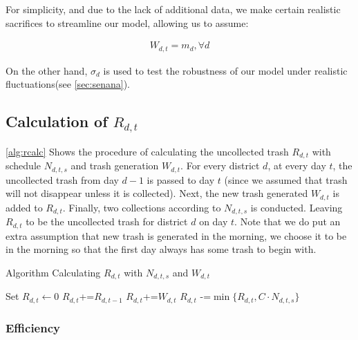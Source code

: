 \documentclass{article}
\begin{document}
For simplicity, and due to the lack of additional data, we make certain realistic sacrifices to streamline our model, allowing us to assume:

\begin{align}
    W_{d,t} = m_d,  \forall d
\end{align}

On the other hand, $\sigma_d$ is used to test the robustness of our model under realistic fluctuations(see \cref{sec:senana}).

\subsection{Calculation of $R_{d,t}$}

\cref{alg:rcalc} Shows the procedure of calculating the uncollected trash $R_{d,t}$ with schedule $N_{d,t,s}$ and trash generation $W_{d,t}$. For every district $d$, at every day $t$, the uncollected trash from day $d - 1$ is passed to day $t$ (since we assumed that trash will not disappear unless it is collected). Next, the new trash generated $W_{d,t}$ is added to $R_{d,t}$. Finally, two collections according to $N_{d,t,s}$ is conducted. Leaving $R_{d,t}$ to be the uncollected trash for district $d$ on day $t$. Note that we do put an extra assumption that new trash is generated in the morning, we choose it to be in the morning so that the first day always has some trash to begin with.

\begin{algorithm}
\caption{Algorithm Calculating $R_{d,t}$ with $N_{d,t,s}$ and $W_{d,t}$}    \label{alg:rcalc}
\begin{algorithmic}
\State Set $R_{d,t} \leftarrow 0$
     
         
        \State $R_{d,t} $+=$ R_{d, t - 1}$ 
        \EndIf
        \State $R_{d,t} $+=$ W_{d,t}$ 
        \State $R_{d,t} $ -=$ \min \{ R_{d,t}, C \cdot N_{d,t,s} \}$ 
        \EndFor
        \EndFor
    \EndFor
\end{algorithmic}
\end{algorithm}

\subsubsection{Efficiency}
\end{document}
